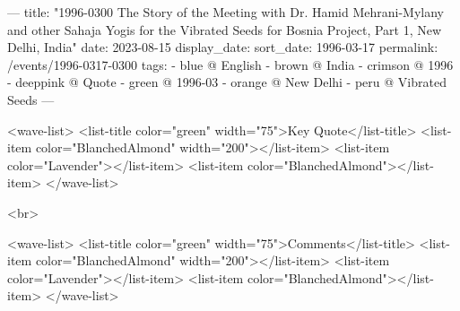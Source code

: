 ---
title: "1996-0300 The Story of the Meeting with Dr. Hamid Mehrani-Mylany and other Sahaja Yogis for the Vibrated Seeds for Bosnia Project, Part 1, New Delhi, India"
date: 2023-08-15
display_date: 
sort_date: 1996-03-17
permalink: /events/1996-0317-0300
tags:
  - blue @ English
  - brown @ India
  - crimson @ 1996
  - deeppink @ Quote
  - green @ 1996-03
  - orange @ New Delhi
  - peru @ Vibrated Seeds
---

<wave-list>
  <list-title color="green" width="75">Key Quote</list-title>
  <list-item color="BlanchedAlmond"  width="200"></list-item>
  <list-item color="Lavender"></list-item>
  <list-item color="BlanchedAlmond"></list-item>
</wave-list>

<br>

<wave-list>
  <list-title color="green" width="75">Comments</list-title>
  <list-item color="BlanchedAlmond"  width="200"></list-item>
  <list-item color="Lavender"></list-item>
  <list-item color="BlanchedAlmond"></list-item>
</wave-list>